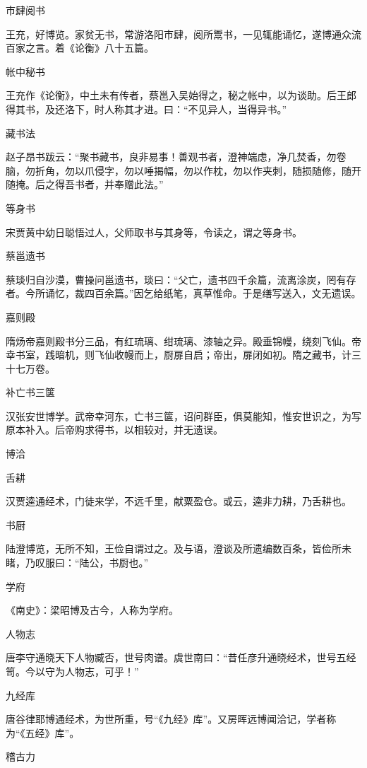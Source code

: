 \documentclass[a4paper,12pt,UTF8,twoside]{ctexbook}
\begin{document}
    市肆阅书
    
    王充，好博览。家贫无书，常游洛阳市肆，阅所鬻书，一见辄能诵忆，遂博通众流百家之言。着《论衡》八十五篇。
    
    帐中秘书
    
    王充作《论衡》，中土未有传者，蔡邕入吴始得之，秘之帐中，以为谈助。后王郎得其书，及还洛下，时人称其才进。曰：“不见异人，当得异书。”
    
    藏书法
    
    赵子昂书跋云：“聚书藏书，良非易事！善观书者，澄神端虑，净几焚香，勿卷脑，勿折角，勿以爪侵字，勿以唾揭幅，勿以作枕，勿以作夹刺，随损随修，随开随掩。后之得吾书者，并奉赠此法。”
    
    等身书
    
    宋贾黄中幼日聪悟过人，父师取书与其身等，令读之，谓之等身书。
    
    蔡邕遗书
    
    蔡琰归自沙漠，曹操问邕遗书，琰曰：“父亡，遗书四千余篇，流离涂炭，罔有存者。今所诵忆，裁四百余篇。”因乞给纸笔，真草惟命。于是缮写送入，文无遗误。
    
    嘉则殿
    
    隋炀帝嘉则殿书分三品，有红琉璃、绀琉璃、漆轴之异。殿垂锦幔，绕刻飞仙。帝幸书室，践暗机，则飞仙收幔而上，厨扉自启；帝出，扉闭如初。隋之藏书，计三十七万卷。
    
    补亡书三箧
    
    汉张安世博学。武帝幸河东，亡书三箧，诏问群臣，俱莫能知，惟安世识之，为写原本补入。后帝购求得书，以相较对，并无遗误。
    
    博洽
    
    舌耕
    
    汉贾逵通经术，门徒来学，不远千里，献粟盈仓。或云，逵非力耕，乃舌耕也。
    
    书厨
    
    陆澄博览，无所不知，王俭自谓过之。及与语，澄谈及所遗编数百条，皆俭所未睹，乃叹服曰：“陆公，书厨也。”
    
    学府
    
    《南史》：梁昭博及古今，人称为学府。
    
    人物志
    
    唐李守通晓天下人物臧否，世号肉谱。虞世南曰：“昔任彦升通晓经术，世号五经笥。今以守为人物志，可乎！”
    
    九经库
    
    唐谷律耶博通经术，为世所重，号“《九经》库”。又房晖远博闻洽记，学者称为“《五经》库”。
    
    稽古力
    
\end{document}
